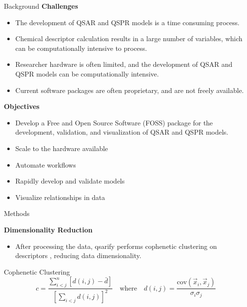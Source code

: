 \documentclass[final]{beamer}
\newlength{\colwidth}
\begin{document}
\begin{frame}[t]
\begin{columns}[t]
\begin{column}{\colwidth}
\begin{block}{Background}
					\large{\bfseries{Challenges}} \smallskip

					\begin{itemize}
						\item The development of QSAR and QSPR models is a time consuming process.
						\item Chemical descriptor calculation results in a large number of variables, which can be computationally intensive to process.
						\item Researcher hardware is often limited, and the development of QSAR and QSPR models can be computationally intensive.
						\item Current software packages are often proprietary, and are not freely available.
					\end{itemize}

					\large{\bfseries{Objectives}} \smallskip

					\begin{itemize}
						\item Develop a Free and Open Source Software (FOSS) package for the development, validation, and visualization of QSAR and QSPR models.
						\item Scale to the hardware available
						\item Automate workflows
						\item Rapidly develop and validate models
						\item Visualize relationships in data
					\end{itemize}

				\end{block}

				\begin{block}{Methods}

\large{\bfseries{Dimensionality Reduction}} \smallskip

					\begin{itemize}
						\item After processing the data, qsarify performs cophenetic clustering on descriptors \cite{rohlf1968}, reducing data dimensionality.
					\end{itemize}

					\begin{equ}{Cophenetic Clustering}
						\begin{equation}
							c = \frac{\sum_{i<j}^{n}[ d(i,j) - \bar{d}]}{[\sum_{i<j} d(i,j)]^2} \quad \text{where} \quad d(i,j) = \frac{\text{cov}(\vec{x}_i, \vec{x}_j)}{\sigma_i \sigma_j }
						\end{equation}
						\caption{Cophenetic correlation of the clustering based on the Euclidean distance $d$ of the Pearson correlation of each descriptor, creating hierarchical clustering.}
					\end{equ}


\end{block}
\end{column}
\end{columns}
\end{frame}
\end{document}
